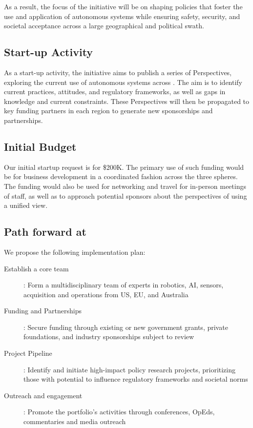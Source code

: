 \documentclass[11pt,letterpaper]{article}
\begin{document}
As a result, the focus of the initiative will be on shaping policies
that foster the use and application of autonomous systems while
ensuring safety, security, and societal acceptance across a large
geographical and political swath.


\subsection{Start-up Activity}
As a start-up activity, the initiative aims to publish a series of
Perspectives, exploring the current use of autonomous systems across
\auke. The aim is to identify current practices, attitudes, and
regulatory frameworks, as well as gaps in knowledge and current
constraints. These Perspectives will then be propagated to key funding
partners in each region to generate new sponsorships and partnerships.

\subsection{Initial Budget}

Our initial startup request is for \$200K. The primary use of such
funding would be for business development in a coordinated fashion
across the three spheres. The funding would also be used for
networking and travel for in-person meetings of \org staff, as well as
to approach potential sponsors about the perspectives of using a
unified view. 

\pagebreak

\subsection{Path forward at \org}

We propose the following implementation plan:

\begin{description}

\item[Establish a core team]: Form a multidisciplinary team of \org
  experts in robotics, AI, sensors, acquisition and operations from
  \org US, EU, and Australia

\item[Funding and Partnerships]: Secure funding through existing or
  new government grants, private foundations, and industry
  sponsorships subject to review

\item[Project Pipeline]: Identify and initiate high-impact policy
  research projects, prioritizing those with potential to influence
  regulatory frameworks and societal norms
  
\item[Outreach and engagement]: Promote the portfolio’s activities
  through conferences, OpEds, commentaries and media outreach

\end{description}
\end{document}
